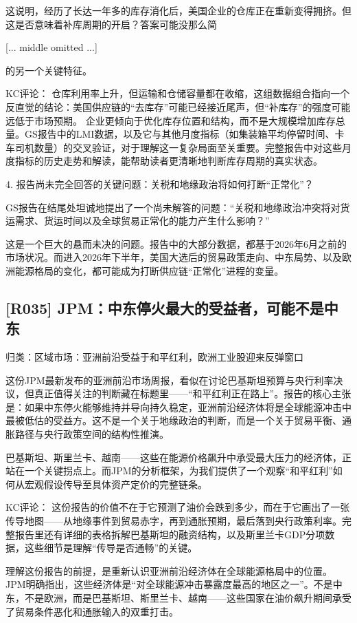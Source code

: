 \documentclass[11pt]{ctexart}
\begin{document}
这说明，经历了长达一年多的库存消化后，美国企业的仓库正在重新变得拥挤。但这是否意味着补库周期的开启？答案可能没那么简

[... middle omitted ...]

的另一个关键特征。

KC评论： 仓库利用率上升，但运输和仓储容量都在收缩，这组数据组合指向一个反直觉的结论：美国供应链的“去库存”可能已经接近尾声，但“补库存”的强度可能远低于市场预期。 企业更倾向于优化库存位置和结构，而不是大规模增加库存总量。GS报告中的LMI数据，以及它与其他月度指标（如集装箱平均停留时间、卡车司机数量）的交叉验证，对于理解这一复杂局面至关重要。完整报告中对这些月度指标的历史走势和解读，能帮助读者更清晰地判断库存周期的真实状态。

4. 报告尚未完全回答的关键问题：关税和地缘政治将如何打断“正常化”？

GS报告在结尾处坦诚地提出了一个尚未解答的问题：“关税和地缘政治冲突将对货运需求、货运时间以及全球贸易正常化的能力产生什么影响？”

这是一个巨大的悬而未决的问题。报告中的大部分数据，都基于2026年6月之前的市场状况。而进入2026年下半年，美国大选后的贸易政策走向、中东局势、以及欧洲能源格局的变化，都可能成为打断供应链“正常化”进程的变量。

\subsection{[R035] JPM：中东停火最大的受益者，可能不是中东}
{\small\color{refgray}归类：区域市场：亚洲前沿受益于和平红利，欧洲工业股迎来反弹窗口}

这份JPM最新发布的亚洲前沿市场周报，看似在讨论巴基斯坦预算与央行利率决议，但真正值得关注的判断藏在标题里——“和平红利正在路上”。报告的核心主张是：如果中东停火能够维持并导向持久稳定，亚洲前沿经济体将是全球能源冲击中最被低估的受益方。这不是一个关于地缘政治的判断，而是一个关于贸易平衡、通胀路径与央行政策空间的结构性推演。

巴基斯坦、斯里兰卡、越南——这些在能源价格飙升中承受最大压力的经济体，正站在一个关键拐点上。而JPM的分析框架，为我们提供了一个观察“和平红利”如何从宏观假设传导至具体资产定价的完整链条。

KC评论： 这份报告的价值不在于它预测了油价会跌到多少，而在于它画出了一张传导地图——从地缘事件到贸易赤字，再到通胀预期，最后落到央行政策利率。完整报告里还有详细的表格拆解巴基斯坦的融资结构，以及斯里兰卡GDP分项数据，这些细节是理解“传导是否通畅”的关键。

理解这份报告的前提，是重新认识亚洲前沿经济体在全球能源格局中的位置。JPM明确指出，这些经济体是“对全球能源冲击暴露度最高的地区之一”。不是中东，不是欧洲，而是巴基斯坦、斯里兰卡、越南——这些国家在油价飙升期间承受了贸易条件恶化和通胀输入的双重打击。
\end{document}
